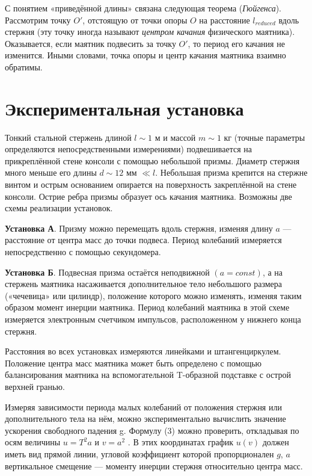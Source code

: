 \documentclass[12pt, a4paper]{article}
\begin{document}
С понятием «приведённой длины» 
\newline
связана следующая теорема (\textit{Гюйгенса}).
Рассмотрим точку $O'$, отстоящую от точки опоры $O$ на расстояние
$l_{reduced}$ вдоль стержня (эту точку иногда называют \textit{центром качания}
физического маятника). Оказывается, если маятник подвесить за точку $O'$, то
период его качания не изменится. Иными словами, точка опоры и центр качания
маятника взаимно обратимы.

\section{Экспериментальная установка}

Тонкий стальной стержень длиной $l \sim 1$ м и массой $m \sim 1$ кг (точные
параметры определяются непосредственными измерениями) подвешивается на
прикреплённой стене консоли с помощью небольшой призмы. Диаметр стержня много
меньше его длины $ d \sim 12$ мм $\ll l$. Небольшая призма крепится на стержне
винтом и острым основанием опирается на поверхность закреплённой на стене
консоли. Острие ребра призмы образует ось качания маятника. Возможны две схемы
реализации установок.

\textbf{Установка А}. Призму можно перемещать вдоль стержня, изменяя
длину $a$ — расстояние от центра масс до точки подвеса. Период колебаний
измеряется непосредственно с помощью секундомера.

\textbf{Установка Б}. Подвесная призма остаётся неподвижной $(a = const)$, а
на стержень маятника насаживается дополнительное тело небольшого размера
(«чечевица» или цилиндр), положение которого можно изменять, изменяя таким
образом момент инерции маятника. Период колебаний маятника в этой схеме
измеряется электронным счетчиком импульсов, расположенном у нижнего конца
стержня.

Расстояния во всех установках измеряются линейками и штангенциркулем.
Положение центра масс маятника может быть определено с помощью
балансирования маятника на вспомогательной T-образной подставке с
острой верхней гранью.

Измеряя зависимости периода малых колебаний от положения стержня
или дополнительного тела на нём, можно экспериментально вычислить значение
ускорения свободного падения g. Формулу (3) можно проверить, откладывая по
осям величины $u = T^2a$ и $v = a^2$ . В этих координатах график $u(v)$ должен
иметь вид прямой линии, угловой коэффициент которой пропорционален $g$, $a$
вертикальное смещение — моменту инерции стержня относительно центра масс.
\end{document}
